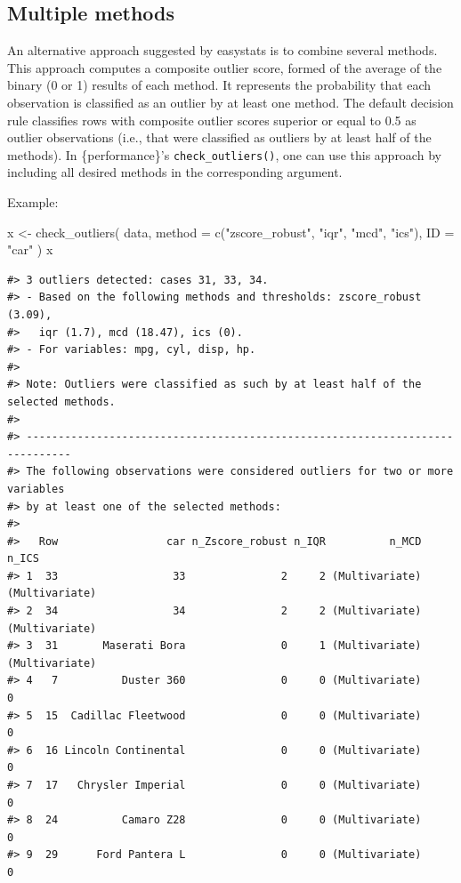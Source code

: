 \documentclass[
]{article}
\newenvironment{Shaded}{\begin{snugshade}}{\end{snugshade}}
\newcommand{\AttributeTok}[1]{\textcolor[rgb]{0.77,0.63,0.00}{#1}}
\newcommand{\FunctionTok}[1]{\textcolor[rgb]{0.00,0.00,0.00}{#1}}
\newcommand{\NormalTok}[1]{#1}
\newcommand{\OtherTok}[1]{\textcolor[rgb]{0.56,0.35,0.01}{#1}}
\newcommand{\StringTok}[1]{\textcolor[rgb]{0.31,0.60,0.02}{#1}}
\begin{document}
\hypertarget{multiple-methods}{%
\subsection{Multiple methods}\label{multiple-methods}}

An alternative approach suggested by easystats is to combine several methods. This approach computes a composite outlier score, formed of the average of the binary (0 or 1) results of each method. It represents the probability that each observation is classified as an outlier by at least one method. The default decision rule classifies rows with composite outlier scores superior or equal to 0.5 as outlier observations (i.e., that were classified as outliers by at least half of the methods). In \{performance\}'s \texttt{check\_outliers()}, one can use this approach by including all desired methods in the corresponding argument.

Example:



\begin{Shaded}
\begin{Highlighting}[]
\NormalTok{x }\OtherTok{\textless{}{-}} \FunctionTok{check\_outliers}\NormalTok{(}
\NormalTok{  data,}
  \AttributeTok{method =} \FunctionTok{c}\NormalTok{(}\StringTok{"zscore\_robust"}\NormalTok{, }\StringTok{"iqr"}\NormalTok{, }\StringTok{"mcd"}\NormalTok{, }\StringTok{"ics"}\NormalTok{),}
  \AttributeTok{ID =} \StringTok{"car"}
\NormalTok{)}
\NormalTok{x}
\end{Highlighting}
\end{Shaded}

\begin{verbatim}
#> 3 outliers detected: cases 31, 33, 34.
#> - Based on the following methods and thresholds: zscore_robust (3.09),
#>   iqr (1.7), mcd (18.47), ics (0).
#> - For variables: mpg, cyl, disp, hp.
#> 
#> Note: Outliers were classified as such by at least half of the selected methods. 
#> 
#> -----------------------------------------------------------------------------
#> The following observations were considered outliers for two or more variables 
#> by at least one of the selected methods: 
#> 
#>   Row                 car n_Zscore_robust n_IQR          n_MCD          n_ICS
#> 1  33                  33               2     2 (Multivariate) (Multivariate)
#> 2  34                  34               2     2 (Multivariate) (Multivariate)
#> 3  31       Maserati Bora               0     1 (Multivariate) (Multivariate)
#> 4   7          Duster 360               0     0 (Multivariate)              0
#> 5  15  Cadillac Fleetwood               0     0 (Multivariate)              0
#> 6  16 Lincoln Continental               0     0 (Multivariate)              0
#> 7  17   Chrysler Imperial               0     0 (Multivariate)              0
#> 8  24          Camaro Z28               0     0 (Multivariate)              0
#> 9  29      Ford Pantera L               0     0 (Multivariate)              0
\end{verbatim}
\end{document}
